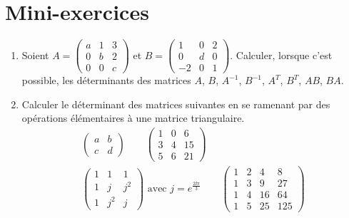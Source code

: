 \section{Mini-exercices}

\begin{frame}
\begin{miniexercice}
\begin{enumerate}
  \item Soient $A = \begin{pmatrix}a&1&3\\0&b&2\\0&0&c\end{pmatrix}$
  et $B = \begin{pmatrix}1&0&2\\0&d&0\\-2&0&1\end{pmatrix}$.
  Calculer, lorsque c'est possible, les déterminants des matrices $A$, $B$,
  $A^{-1}$, $B^{-1}$, $A^T$, $B^T$, $AB$, $BA$.
  
  \item Calculer le déterminant des matrices suivantes en se 
  ramenant par des opérations élémentaires à une matrice triangulaire.
\begin{gather*}
\begin{pmatrix}a&b\\c&d\end{pmatrix}
  \qquad
  \begin{pmatrix}1&0&6\\3&4&15\\5&6&21\end{pmatrix}\\
  \begin{pmatrix}1&1&1\\1&j&j^2\\1&j^2&j\end{pmatrix} \text{ avec } j=e^{\frac{2\ii\pi}{3}}\qquad
  \begin{pmatrix}1&2&4&8\\1&3&9&27\\1&4&16&64\\1&5&25&125\end{pmatrix}
\end{gather*}
\end{enumerate}
\end{miniexercice}
\end{frame}

